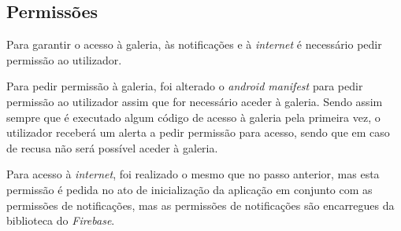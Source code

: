 \subsection{Permissões}

Para garantir o acesso à galeria, às notificações e à \textit{internet} é necessário pedir permissão ao utilizador.

Para pedir permissão à galeria, foi alterado o \textit{android manifest} para pedir permissão ao utilizador assim que for necessário aceder à galeria. Sendo assim sempre que é executado algum código de acesso à galeria pela primeira vez, o utilizador receberá um alerta a pedir permissão para acesso, sendo que em caso de recusa não será possível aceder à galeria.

Para acesso à \textit{internet}, foi realizado o mesmo que no passo anterior, mas esta permissão é pedida no ato de inicialização da aplicação em conjunto com as permissões de notificações, mas as permissões de notificações são encarregues da biblioteca do \textit{Firebase}.